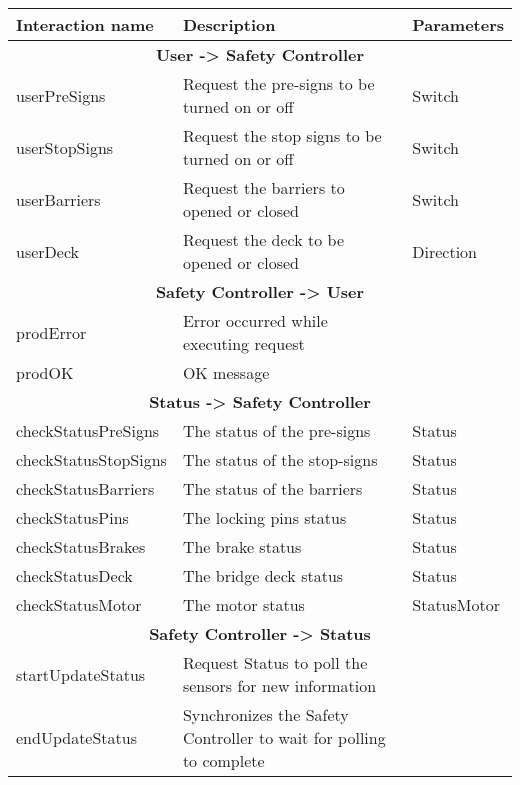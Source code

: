 	
\begin{center}
	\begin{longtable}{|l|p{8cm}|l|}
		\hline
		\textbf{Interaction name} & \textbf{Description} & \textbf{Parameters} \\ \hline
		\multicolumn{3}{c}{\textbf{User -> Safety Controller}} \\ \hline
		userPreSigns & Request the pre-signs to be turned on or off & Switch \\
		userStopSigns & Request the stop signs to be turned on or off & Switch \\
		userBarriers & Request the barriers to opened or closed & Switch \\
		userDeck & Request the deck to be opened or closed & Direction \\
		
		

		\hline 
		\multicolumn{3}{c}{\textbf{Safety Controller -> User}}\\ \hline
		prodError & Error occurred while executing request &   \\
		prodOK & OK message &   \\
	
		\hline
		\multicolumn{3}{c}{\textbf{Status -> Safety Controller}} \\ \hline
		checkStatusPreSigns & The status of the pre-signs & Status \\
		checkStatusStopSigns & The status of the stop-signs & Status \\
		checkStatusBarriers & The status of the barriers & Status \\
		checkStatusPins & The locking pins status & Status \\
		checkStatusBrakes & The brake status & Status \\
		checkStatusDeck & The bridge deck status & Status \\
		checkStatusMotor & The motor status & StatusMotor \\
		
		\hline
		\multicolumn{3}{c}{\textbf{Safety Controller -> Status}} \\ \hline
		startUpdateStatus & Request Status to poll the sensors for new information & \\
		endUpdateStatus & Synchronizes the Safety Controller to wait for polling to complete & \\
		

\end{longtable}
\end{center}
